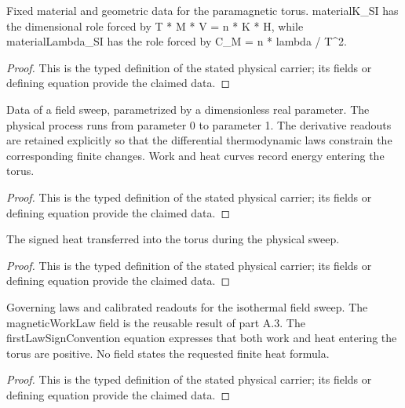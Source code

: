 \begin{definition}
  \label{def:physics:IPhO_2026_3_B_1:aux002}
  Fixed material and geometric data for the paramagnetic torus. materialK\_SI has the dimensional role forced by T * M * V = n * K * H, while materialLambda\_SI has the role forced by C\_M = n * lambda / T\textasciicircum{}2.
\end{definition}
\begin{proof}
  This is the typed definition of the stated physical carrier; its fields or defining equation provide the claimed data.
\end{proof}

\begin{definition}
  \label{def:physics:IPhO_2026_3_B_1:aux003}
  Data of a field sweep, parametrized by a dimensionless real parameter. The physical process runs from parameter 0 to parameter 1. The derivative readouts are retained explicitly so that the differential thermodynamic laws constrain the corresponding finite changes. Work and heat curves record energy entering the torus.
\end{definition}
\begin{proof}
  This is the typed definition of the stated physical carrier; its fields or defining equation provide the claimed data.
\end{proof}

\begin{definition}
  \label{def:physics:IPhO_2026_3_B_1:aux004}
  The signed heat transferred into the torus during the physical sweep.
\end{definition}
\begin{proof}
  This is the typed definition of the stated physical carrier; its fields or defining equation provide the claimed data.
\end{proof}

\begin{definition}
  \label{def:physics:IPhO_2026_3_B_1:aux005}
  Governing laws and calibrated readouts for the isothermal field sweep. The magneticWorkLaw field is the reusable result of part A.3. The firstLawSignConvention equation expresses that both work and heat entering the torus are positive. No field states the requested finite heat formula.
\end{definition}
\begin{proof}
  This is the typed definition of the stated physical carrier; its fields or defining equation provide the claimed data.
\end{proof}

